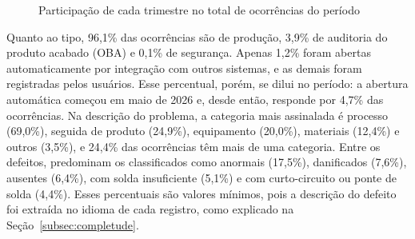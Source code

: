 \begin{figure}[htb]
    \centering
    \caption{Participação de cada trimestre no total de ocorrências do período}
    \label{fig:volume-trimestral}
\end{figure}

Quanto ao tipo, 96,1\% das ocorrências são de produção, 3,9\% de auditoria do produto acabado (OBA) e 0,1\% de segurança. Apenas 1,2\% foram abertas automaticamente por integração com outros sistemas, e as demais foram registradas pelos usuários. Esse percentual, porém, se dilui no período: a abertura automática começou em maio de 2026 e, desde então, responde por 4,7\% das ocorrências. Na descrição do problema, a categoria mais assinalada é processo (69,0\%), seguida de produto (24,9\%), equipamento (20,0\%), materiais (12,4\%) e outros (3,5\%), e 24,4\% das ocorrências têm mais de uma categoria. Entre os defeitos, predominam os classificados como anormais (17,5\%), danificados (7,6\%), ausentes (6,4\%), com solda insuficiente (5,1\%) e com curto-circuito ou ponte de solda (4,4\%). Esses percentuais são valores mínimos, pois a descrição do defeito foi extraída no idioma de cada registro, como explicado na Seção~\ref{subsec:completude}.

